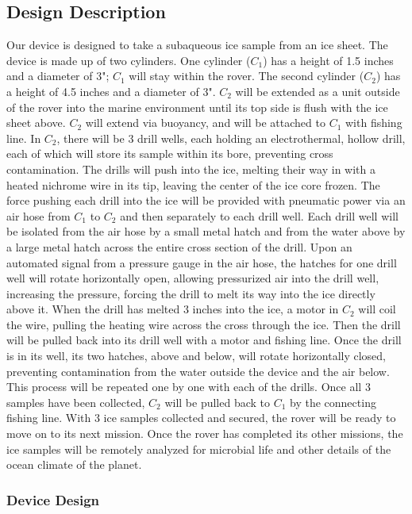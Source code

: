 \documentclass{article}
\begin{document}
\subsection{Design Description}
Our device is designed to take a subaqueous ice sample from an ice sheet. The device is made up of two cylinders. One cylinder ($C_1$) has a height of 1.5 inches and a diameter of 3"; $C_1$ will stay within the rover. The second cylinder ($C_2$) has a height of 4.5 inches and a diameter of 3". $C_2$ will be extended as a unit outside of the rover into the marine environment until its top side is flush with the ice sheet above. $C_2$ will extend via buoyancy, and will be attached to $C_1$ with fishing line. In $C_2$, there will be 3 drill wells, each holding an electrothermal, hollow drill, each of which will store its sample within its bore, preventing cross contamination. The drills will push into the ice, melting their way in with a heated nichrome wire in its tip, leaving the center of the ice core frozen. The force pushing each drill into the ice will be provided with pneumatic power via an air hose from $C_1$ to $C_2$ and then separately to each drill well. Each drill well will be isolated from the air hose by a small metal hatch and from the water above by a large metal hatch across the entire cross section of the drill. Upon an automated signal from a pressure gauge in the air hose, the hatches for one drill well will rotate horizontally open, allowing pressurized air into the drill well, increasing the pressure, forcing the drill to melt its way into the ice directly above it. When the drill has melted 3 inches into the ice, a motor in $C_2$ will coil the wire, pulling the heating wire across the cross through the ice. Then the drill will be pulled back into its drill well with a motor and fishing line. Once the drill is in its well, its two hatches, above and below, will rotate horizontally closed, preventing contamination from the water outside the device and the air below. This process will be repeated one by one with each of the drills. Once all 3 samples have been collected, $C_2$ will be pulled back to $C_1$ by the connecting fishing line. With 3 ice samples collected and secured, the rover will be ready to move on to its next mission. Once the rover has completed its other missions, the ice samples will be remotely analyzed for microbial life and other details of the ocean climate of the planet.

\subsubsection{Device Design}
\end{document}
